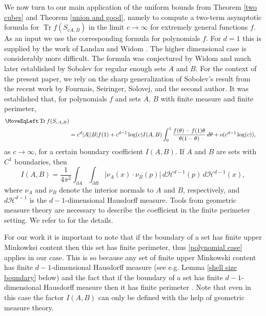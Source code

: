 \documentclass[12pt]{amsart}
\numberwithin{equation}{section}
\begin{document}
 
We now turn to our main application of the uniform bounds from Theorem \ref{two cubes} and Theorem \ref{union and good}, namely to compute a two-term asymptotic formula for $\operatorname{Tr} f(S_{cA,B})$ in the limit $c\to \infty$ for extremely general functions $f$. As an input we use the corresponding formula for polynomials $f$. For $d=1$ this is supplied by the work of Landau and Widom \cite{widom_landau}. The higher dimensional case is considerably more difficult. The formula was conjectured by Widom \cite{Widom_conj} and much later established by Sobolev \cite{Sobolev13} for regular enough sets $A$ and $B$. For the context of the present paper, we rely on the sharp generalization of Sobolev's result from the recent work \cite{EE_paper} by Fournais, Seiringer, Solovej, and the second author. It was established that, for polynomials $f$ and sets $A$, $B$ with finite measure and finite perimeter,
\begin{equation}\label{polynomial case}
\begin{aligned}
\MoveEqLeft \operatorname{Tr} f(S_{cA,B})\\
&= c^{d} |A| |B|f(1) +  c^{d-1}\log(c)I( A, B)\int_{0}^1 \frac{f(\theta) - f(1)\theta}{\theta(1-\theta)} \, d\theta + o(c^{d-1}\log(c)),
\end{aligned}
\end{equation}
as $c\to\infty$, for a certain boundary coefficient $I(A,B)$. If $A$ and $B$ are sets with $C^1$ boundaries, then 
\[
I(A,B) = \frac{1}{4\pi^2} \int_{\partial A} \int_{\partial B} |\nu_A(x) \cdot \nu_B(p)| \, d\mathcal{H}^{d-1}(p) \, d\mathcal{H}^{d-1}(x),
\]
where $\nu_A$ and $\nu_B$ denote the interior normals to $A$ and $B$, respectively, and $d\mathcal{H}^{d-1}$ is the $d-1$-dimensional Hausdorff measure. Tools from geometric measure theory are necessary to describe the coefficient in the finite perimeter setting. We refer to \cite{EE_paper} for the details.  

For our work it is important to note that if the boundary of a set has finite upper Minkowksi content then this set has finite perimeter, thus \eqref{polynomial case} applies in our case. This is so because any set of finite upper Minkowski content has finite $d-1$-dimensional Hausdorff measure (see e.g. Lemma \ref{shell size boundary} below) and the fact that if the boundary of a set has finite $d-1$-dimensional Hausdorff measure then it has finite perimeter \cite[Proposition 3.62]{Ambrosio_00}. Note that even in this case the factor $I(A,B)$ can only be defined with the help of geometric measure theory.
\end{document}
